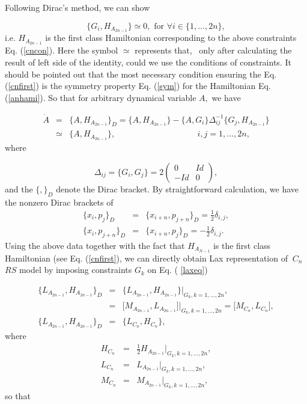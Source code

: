 \documentclass[a4paper,12pt]{article}
\begin{document}
\noindent Following Dirac's method\cite{Dirac}, we can show

\begin{equation}
\{G_{i},H_{A_{2n-1}}\}\simeq 0,\mbox{\ \ \ for \ \ \ \ }\forall i\in
\{1,\ldots ,2n\},  \label{cnfirst}
\end{equation}
i.e. $H_{A_{2n-1}}$ is the first class Hamiltonian corresponding to the
above constraints Eq. (\ref{cncon}). Here the symbol $\simeq $ represents
that, \ only after calculating the result of left side of the identity,
could we use the conditions of constraints. It should be pointed out that
the most necessary condition ensuring the Eq. (\ref{cnfirst}) is the
symmetry property Eq. (\ref{sym}) for the Hamiltonian Eq. (\ref{anhami}). So
that for arbitrary dynamical variable $A,$ we have

\begin{eqnarray}
\dot{A} &=&\{A,H_{A_{2n-1}}\}_{D}=\{A,H_{A_{2n-1}}\}-\{A,G_{i}\}\Delta
_{ij}^{-1}\{G_{j},H_{A_{2n-1}}\}  \nonumber \\
&\simeq &\{A,H_{A_{2n-1}}\},\qquad \ \ \ \ \ \ \ \ \ \ \ \ \ \ \ \ \ \ \ \ \
\ \ \ \ \ \ \ \ \ \ \ \ \ \ i,j=1,\ldots ,2n,  \label{cnevo}
\end{eqnarray}
where

\vspace{1pt}
\begin{equation}
\Delta _{ij}=\{G_{i},G_{j}\}=2\left(
\begin{array}{cc}
0 & Id \\
-Id & 0
\end{array}
\right) ,
\end{equation}
and the $\{,\}_{D}$ denote the Dirac bracket. By straightforward
calculation, we have the nonzero Dirac brackets of
\begin{eqnarray}
\{x_{i},p_{j}\}_{D} &=&\{x_{i+n},p_{j+n}\}_{D}=\frac{1}{2}\delta _{i,j},
\nonumber \\
\{x_{i},p_{j+n}\}_{D} &=&\{x_{i+n},p_{j}\}_{D}=-\frac{1}{2}\delta _{i,j}.
\label{DBra}
\end{eqnarray}
Using the above data together with the fact that $H_{A_{N-1}}$ is the first
class Hamiltonian (see Eq. (\ref{cnfirst}), we can directly obtain Lax
representation of $\ C_{n}$ $RS$ model by imposing constraints $G_{k}$ on Eq. (%
\ref{laxeq})

\begin{eqnarray}
\{L_{A_{2n-1}},H_{A_{2n-1}}\}_{D}
&=&\{L_{A_{2n-1}},H_{A_{2n-1}}\}|_{G_{k},k=1,...,2n},  \nonumber \\
&=&\lbrack M_{A_{2n-1}},L_{A_{2n-1}}\rbrack |_{G_{k},k=1,...,2n}=\lbrack
M_{C_{n}},L_{C_{n}}\rbrack, \\
\{L_{A_{2n-1}},H_{A_{2n-1}}\}_{D} &=&\{L_{C_{n}},H_{C_{n}}\},  \label{dicn}
\end{eqnarray}
where
\begin{eqnarray}
H_{C_{n}} &=&\frac{1}{2}H_{A_{2n-1}}|_{G_{k},k=1,...,2n},  \nonumber \\
L_{C_{n}} &=&L_{A_{2n-1}}|_{G_{k},k=1,...,2n},	\nonumber \\
M_{C_{n}} &=&M_{A_{2n-1}}|_{G_{k},k=1,...,2n},	\label{reduce}
\end{eqnarray}
so that
\end{document}
